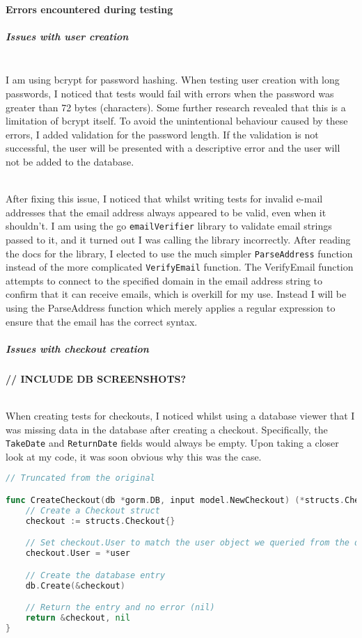 \documentclass[../../main.tex]{subfiles}
\begin{document}
\paragraph{Errors encountered during testing}

\subparagraph{Issues with user creation}

\noindent \\ I am using bcrypt for password hashing. When testing user creation with long passwords, I noticed that tests would fail with errors when the password was greater than 72 bytes (characters).
Some further research revealed that this is a limitation of bcrypt itself.
To avoid the unintentional behaviour caused by these errors, I added validation for the password length.
If the validation is not successful, the user will be presented with a descriptive error and the user will not be added to the database.

\noindent \\ After fixing this issue, I noticed that whilst writing tests for invalid e-mail addresses that the email address always appeared to be valid, even when it shouldn't.
I am using the go \lstinline{emailVerifier} library to validate email strings passed to it, and it turned out I was calling the library incorrectly.
After reading the docs for the library, I elected to use the much simpler \lstinline{ParseAddress} function instead of the more complicated \lstinline{VerifyEmail} function.
The VerifyEmail function attempts to connect to the specified domain in the email address string to confirm that it can receive emails, which is overkill for my use.
Instead I will be using the ParseAddress function which merely applies a regular expression to ensure that the email has the correct syntax.

\subparagraph{Issues with checkout creation}

\textbf{// INCLUDE DB SCREENSHOTS?}

\noindent \\ When creating tests for checkouts, I noticed whilst using a database viewer that I was missing data in the database after creating a checkout. Specifically, the \lstinline{TakeDate} and \lstinline{ReturnDate} fields would always be empty.
Upon taking a closer look at my code, it was soon obvious why this was the case.

\begin{lstlisting}[language=Go]
// Truncated from the original

func CreateCheckout(db *gorm.DB, input model.NewCheckout) (*structs.Checkout, error) {
	// Create a Checkout struct
	checkout := structs.Checkout{}

    // Set checkout.User to match the user object we queried from the database
    checkout.User = *user

	// Create the database entry
	db.Create(&checkout)

    // Return the entry and no error (nil)
	return &checkout, nil
}
\end{lstlisting}
\end{document}
